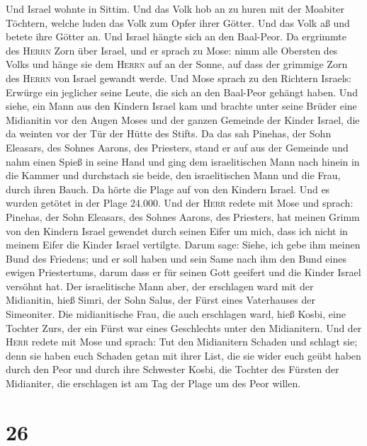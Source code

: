  Und Israel wohnte in Sittim. Und das Volk hob an zu huren
mit der Moabiter Töchtern,  welche luden das Volk zum
Opfer ihrer Götter. Und das Volk aß und betete ihre Götter an.
 Und Israel hängte sich an den Baal-Peor. Da ergrimmte des
\textsc{Herrn} Zorn über Israel,  und er sprach zu Mose:
nimm alle Obersten des Volks und hänge sie dem \textsc{Herrn} auf an der
Sonne, auf dass der grimmige Zorn des \textsc{Herrn} von Israel gewandt
werde.  Und Mose sprach zu den Richtern Israels: Erwürge
ein jeglicher seine Leute, die sich an den Baal-Peor gehängt haben.
 Und siehe, ein Mann aus den Kindern Israel kam und
brachte unter seine Brüder eine Midianitin vor den Augen Moses und der
ganzen Gemeinde der Kinder Israel, die da weinten vor der Tür der Hütte
des Stifts.  Da das sah Pinehas, der Sohn Eleasars, des
Sohnes Aarons, des Priesters, stand er auf aus der Gemeinde und nahm
einen Spieß in seine Hand  und ging dem israelitischen
Mann nach hinein in die Kammer und durchstach sie beide, den
israelitischen Mann und die Frau, durch ihren Bauch. Da hörte die Plage
auf von den Kindern Israel.  Und es wurden getötet in der
Plage 24.000.  Und der \textsc{Herr} redete mit Mose und
sprach:  Pinehas, der Sohn Eleasars, des Sohnes Aarons,
des Priesters, hat meinen Grimm von den Kindern Israel gewendet durch
seinen Eifer um mich, dass ich nicht in meinem Eifer die Kinder Israel
vertilgte.  Darum sage: Siehe, ich gebe ihm meinen Bund
des Friedens;  und er soll haben und sein Same nach ihm
den Bund eines ewigen Priestertums, darum dass er für seinen Gott
geeifert und die Kinder Israel versöhnt hat.  Der
israelitische Mann aber, der erschlagen ward mit der Midianitin, hieß
Simri, der Sohn Salus, der Fürst eines Vaterhauses der Simeoniter.
 Die midianitische Frau, die auch erschlagen ward, hieß
Kosbi, eine Tochter Zurs, der ein Fürst war eines Geschlechts unter den
Midianitern.  Und der \textsc{Herr} redete mit Mose und
sprach:  Tut den Midianitern Schaden und schlagt sie;
 denn sie haben euch Schaden getan mit ihrer List, die
sie wider euch geübt haben durch den Peor und durch ihre Schwester
Kosbi, die Tochter des Fürsten der Midianiter, die erschlagen ist am Tag
der Plage um des Peor willen.

\hypertarget{section-25}{%
\section{26}\label{section-25}}


